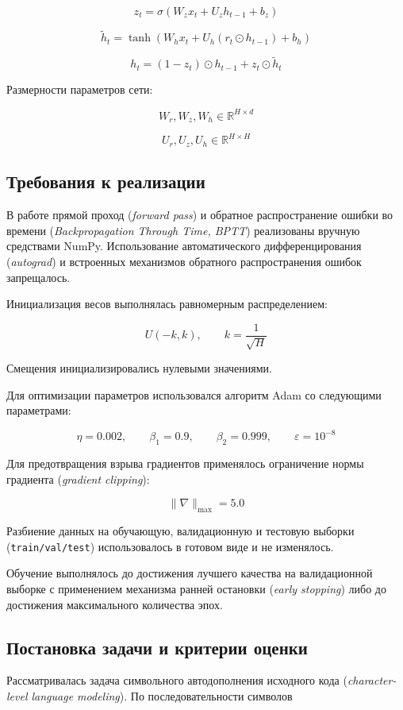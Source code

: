 \[
z_t =
\sigma(W_z x_t + U_z h_{t-1} + b_z)
\]

\[
\widetilde{h}_t =
\tanh
\left(
W_h x_t
+
U_h(r_t \odot h_{t-1})
+
b_h
\right)
\]

\[
h_t =
(1-z_t)\odot h_{t-1}
+
z_t\odot \widetilde{h}_t
\]

Размерности параметров сети:

\[
W_r, W_z, W_h \in \mathbb{R}^{H \times d}
\]

\[
U_r, U_z, U_h \in \mathbb{R}^{H \times H}
\]

\subsection{Требования к реализации}

В работе прямой проход (\textit{forward pass}) и обратное распространение ошибки во времени (\textit{Backpropagation Through Time, BPTT}) реализованы вручную средствами NumPy. Использование автоматического дифференцирования (\textit{autograd}) и встроенных механизмов обратного распространения ошибок запрещалось.

Инициализация весов выполнялась равномерным распределением:

\[
U(-k, k),
\qquad
k = \frac{1}{\sqrt{H}}
\]

Смещения инициализировались нулевыми значениями.

Для оптимизации параметров использовался алгоритм Adam со следующими параметрами:

\[
\eta = 0.002,
\qquad
\beta_1 = 0.9,
\qquad
\beta_2 = 0.999,
\qquad
\varepsilon = 10^{-8}
\]

Для предотвращения взрыва градиентов применялось ограничение нормы градиента (\textit{gradient clipping}):

\[
\|\nabla\|_{\max}=5.0
\]

Разбиение данных на обучающую, валидационную и тестовую выборки (\texttt{train/val/test}) использовалось в готовом виде и не изменялось.

Обучение выполнялось до достижения лучшего качества на валидационной выборке с применением механизма ранней остановки (\textit{early stopping}) либо до достижения максимального количества эпох.

\subsection{Постановка задачи и критерии оценки}

Рассматривалась задача символьного автодополнения исходного кода (\textit{character-level language modeling}). По последовательности символов

